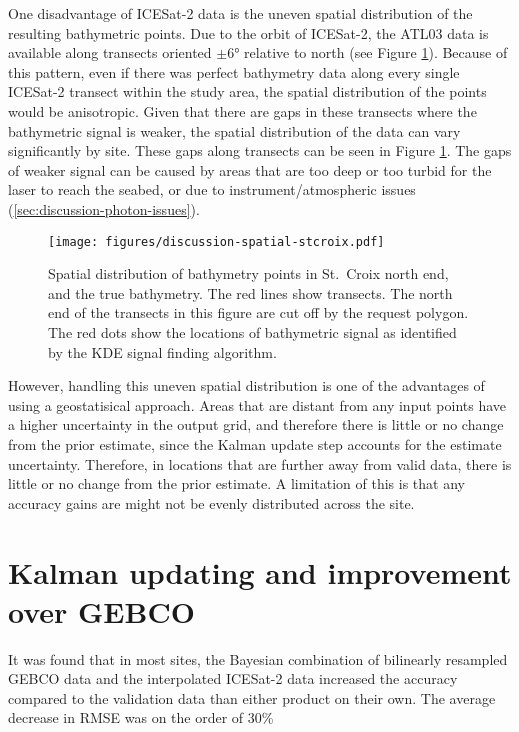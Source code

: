 One disadvantage of ICESat-2 data is the uneven spatial distribution of the resulting bathymetric points. Due to the orbit of ICESat-2, the ATL03 data is available along transects oriented $\pm \ang{6}$ relative to north (see Figure \ref{fig:distribution-of-bathy-points-in-space}). Because of this pattern, even if there was perfect bathymetry data along every single ICESat-2 transect within the study area, the spatial distribution of the points would be anisotropic. Given that there are gaps in these transects where the bathymetric signal is weaker, the spatial distribution of the data can vary significantly by site. These gaps along transects can be seen in Figure \ref{fig:distribution-of-bathy-points-in-space}. The gaps of weaker signal can be caused by areas that are too deep or too turbid for the laser to reach the seabed, or due to instrument/atmospheric issues (\ref{sec:discussion-photon-issues}). 


\begin{figure}
    \centering
    \texttt{[image: figures/discussion-spatial-stcroix.pdf]}
    \caption[Spatial distribution of bathymetry points in St. Croix north end, ]{Spatial distribution of bathymetry points in St.~Croix north end, and the true bathymetry. The red lines show transects. The north end of the transects in this figure are cut off by the request polygon. The red dots show the locations of bathymetric signal as identified by the KDE signal finding algorithm.}
    \label{fig:distribution-of-bathy-points-in-space}
\end{figure}

However, handling this uneven spatial distribution is one of the advantages of using a geostatisical approach. Areas that are distant from any input points have a higher uncertainty in the output grid, and therefore there is little or no change from the prior estimate, since the Kalman update step accounts for the estimate uncertainty. Therefore, in locations that are further away from valid data, there is little or no change from the prior estimate. A limitation of this is that any accuracy gains are might not be evenly distributed across the site. 

\section{Kalman updating and improvement over GEBCO}

It was found that in most sites, the Bayesian combination of bilinearly resampled GEBCO data and the interpolated ICESat-2 data increased the accuracy compared to the validation data than either product on their own. The average decrease in RMSE was on the order of 30\% 

